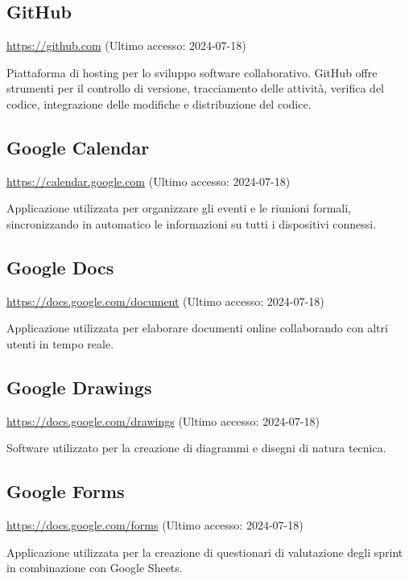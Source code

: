 \subsection{GitHub}
\par \href{https://github.com}{https://github.com} (Ultimo accesso: 2024-07-18)
\par Piattaforma di hosting per lo sviluppo software collaborativo. GitHub offre strumenti per il controllo di versione, tracciamento delle attività, verifica del codice, integrazione delle modifiche e distribuzione del codice.
    
\subsection{Google Calendar}
\par \href{https://calendar.google.com}{https://calendar.google.com} (Ultimo accesso: 2024-07-18)
\par Applicazione utilizzata per organizzare gli eventi e le riunioni formali, sincronizzando in automatico le informazioni su tutti i dispositivi connessi.
    
\subsection{Google Docs}
\par \href{https://docs.google.com/document}{https://docs.google.com/document} (Ultimo accesso: 2024-07-18)
\par Applicazione utilizzata per elaborare documenti online collaborando con altri utenti in tempo reale.

\subsection{Google Drawings}
\par \href{https://docs.google.com/drawings}{https://docs.google.com/drawings} (Ultimo accesso: 2024-07-18)
\par Software utilizzato per la creazione di diagrammi e disegni di natura tecnica.

\subsection{Google Forms}
\par \href{https://docs.google.com/forms}{https://docs.google.com/forms} (Ultimo accesso: 2024-07-18)
\par Applicazione utilizzata per la creazione di questionari di valutazione degli sprint in combinazione con Google Sheets.

